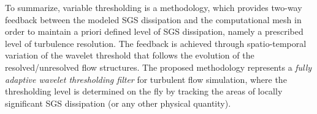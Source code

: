 %










%
%


\clearpage
\newpage


To summarize, variable thresholding is a methodology, which provides two-way feedback between the modeled SGS dissipation and the computational mesh
in order to maintain a priori defined level of SGS dissipation, namely a prescribed level of turbulence resolution.
The feedback is achieved through spatio-temporal variation of the wavelet threshold  that follows the evolution of the resolved/unresolved flow structures. The proposed methodology represents a \emph{fully adaptive wavelet thresholding filter} for turbulent flow simulation, where the thresholding level  is determined on the fly by tracking the areas of locally significant
SGS dissipation (or any other physical quantity).


